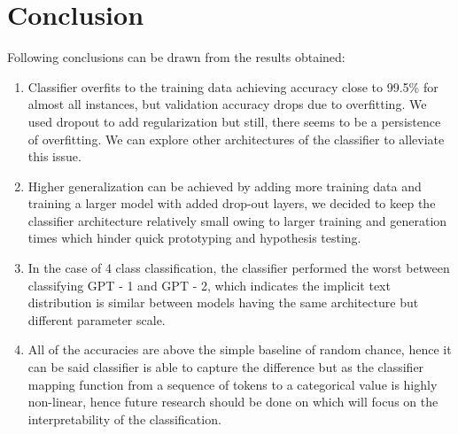 \documentclass[11pt,letterpaper]{article}
\begin{document}
\section{Conclusion}
Following conclusions can be drawn from the results obtained:
\begin{enumerate}
        \item Classifier overfits to the training data achieving accuracy close to 99.5\% for almost all instances, but validation accuracy drops due to overfitting. We used dropout to add regularization but still, there seems to be a persistence of overfitting. We can explore other architectures of the classifier to alleviate this issue.
        \item Higher generalization can be achieved by adding more training data and training a larger model with added drop-out layers, we decided to keep the classifier architecture relatively small owing to larger training and generation times which hinder quick prototyping and hypothesis testing.
        \item In the case of 4 class classification, the classifier performed the worst between classifying GPT - 1 and GPT - 2,  which indicates the implicit text distribution is similar between models having the same architecture but different parameter scale.
        \item All of the accuracies are above the simple baseline of random chance, hence it can be said classifier is able to capture the difference but as the classifier mapping function from a sequence of tokens to a categorical value is highly non-linear, hence future research should be done on which will focus on the interpretability of the classification.
\end{enumerate}

\clearpage


\end{document}
